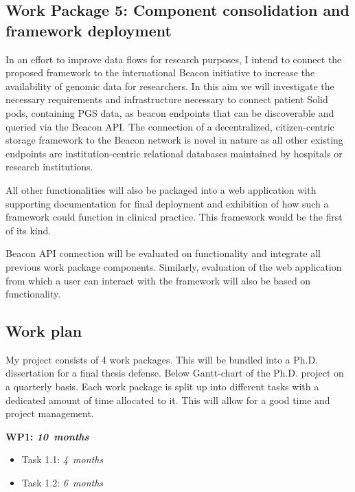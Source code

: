 \documentclass[a4paper,11pt]{article}
\begin{document}
\begin{refsection}
\subsection{Work Package 5: Component consolidation and framework deployment}

In an effort to improve data flows for research purposes, I intend to connect the proposed framework to the international Beacon initiative \cite{rambla_beacon_2022} to increase the availability of genomic data for researchers. 
In this aim we will investigate the necessary requirements and infrastructure necessary to connect patient Solid pods, containing PGS data, as beacon endpoints that can be discoverable and queried via the Beacon API. 
The connection of a decentralized, citizen-centric storage framework to the Beacon network is novel in nature as all other existing endpoints are institution-centric relational databases maintained by hospitals or research institutions.

All other functionalities will also be packaged into a web application with supporting documentation for final deployment and exhibition of how such a framework could function in clinical practice.
This framework would be the first of its kind.

Beacon API connection will be evaluated on functionality and integrate all previous work package components. 
Similarly, evaluation of the web application from which a user can interact with the framework will also be based on functionality.

\subsection{Work plan}
\smallskip

\noindent
My project consists of 4 work packages. 
This will be bundled into a Ph.D. dissertation for a final thesis defense.
Below Gantt-chart of the Ph.D. project on a quarterly basis.  
Each work package is split up into different tasks with a dedicated amount of time allocated to it. 
This will allow for a good time and project management. 


\begin{adjustwidth}{0cm}{0cm}
	\parindent 0pt
	\newcommand\duration[1]{\hfill\emph{#1~months}}
  
	\textbf{WP1:      \WPa  \duration{10}}
	\begin{itemize}
	  \item Task 1.1: \WPaa \duration{ 4}
	  \item Task 1.2: \WPab \duration{ 6}
	\end{itemize}
	\smallskip
  

\end{adjustwidth}
\end{refsection}
\end{document}
